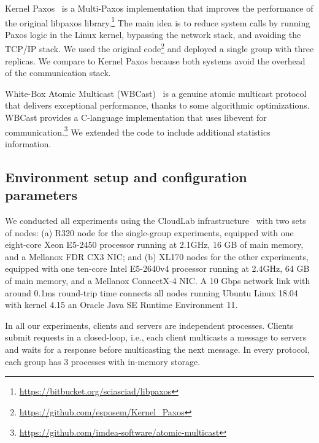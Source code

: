 Kernel Paxos~\cite{esposito2018kernel} is a Multi-Paxos implementation that improves the performance of the original libpaxos library.\footnote{\url{https://bitbucket.org/sciasciad/libpaxos}}
The main idea is to reduce system calls by running Paxos logic in the Linux kernel, bypassing the network stack, and avoiding the TCP/IP stack. 
We used the original code\footnote{\url{https://github.com/esposem/Kernel_Paxos}} and deployed a single group with three replicas.
We compare \libname to Kernel Paxos because both systems avoid the overhead of the communication stack.

White-Box Atomic Multicast (WBCast)~\cite{gotsman2019white} is a genuine atomic multicast protocol that delivers exceptional performance, thanks to some algorithmic optimizations.
 WBCast provides a C-language implementation that uses libevent for communication.\footnote{\url{https://github.com/imdea-software/atomic-multicast}}
 We extended the code to include additional statistics information.


\subsection{Environment setup and configuration parameters}
\label{sec:evaluation:setup}

We conducted all experiments using the CloudLab infrastructure~\cite{DuplyakinATC19cloudlab} with two sets of nodes: 
(a) R320 node for the single-group experiments, equipped with one eight-core Xeon E5-2450 processor running at 2.1GHz, 16 GB of main memory, and a Mellanox FDR CX3 NIC; and (b) XL170 nodes for the other experiments, equipped with one ten-core Intel E5-2640v4 processor running at 2.4GHz, 64 GB of main memory, and a Mellanox ConnectX-4 NIC. 
A 10 Gbps network link with around 0.1ms round-trip time connects all nodes running Ubuntu Linux 18.04 with kernel 4.15 an Oracle Java SE Runtime Environment 11. 

In all our experiments, clients and servers are independent processes. 
Clients submit requests in a closed-loop, i.e., each client multicasts a message to servers and waits for a response before multicasting the next message. 
In every protocol, each group has 3 processes with in-memory storage.

